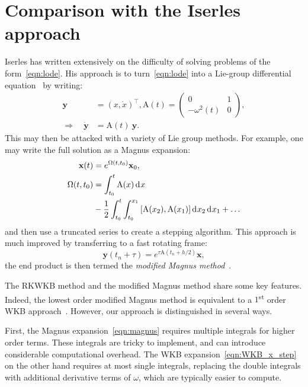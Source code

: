\section{Comparison with the Iserles approach}
\label{sec:iserles_comparison}
Iserles has written extensively on the difficulty of solving problems of the form~\eqref{eqn:lode}. His approach is to turn~\eqref{eqn:lode} into a Lie-group differential equation~\citep{Iserles00lie-groupmethods} by writing:
\begin{align}
  \mathbf{y} &= {(x,\dot{x})}^\top, 
  \mathrm{A}(t) = 
  \left(
  \begin{array}{cc}
    0 & 1 \\
    -\omega^2(t) & 0
  \end{array}
  \right),
  \nonumber\\
  \Rightarrow\quad 
  \dot{\mathbf{y}} &= \mathrm{A} (t) \: \mathbf{y}.\label{eqn:lie_eqn}
\end{align}
This may then be attacked with a variety of Lie group methods. For example, one may write the full solution as a Magnus expansion:
\begin{align}
  \mathbf{x}(t) &= e^{\Omega(t,t_0)} \mathbf{x}_0,
  \label{eqn:magnus}\\
  \Omega(t,t_0) &= \int_{t_0}^t \mathrm{A}(x) \operatorname{d}^{}\!{x} \nonumber \\
  &- \frac{1}{2}\int_{t_0}^t\int_{t_0}^{x_1} \left[\mathrm{A}(x_2),\mathrm{A}(x_1)\right] \operatorname{d}^{}\!{x_2} \operatorname{d}^{}\!{x_1} + \ldots
  \nonumber
\end{align}
and then use a truncated series to create a stepping algorithm.
This approach is much improved by transferring to a fast rotating frame:
\begin{equation}
  \mathbf{y}(t_n+\tau) = e^{\tau \mathrm{A}(t_n+h/2)} \mathbf{x},
  \label{eqn:rotating_frame}
\end{equation}
the end product is then termed the {\em modified Magnus method\/}~\citep{Iserles01thinkglobally}.

The RKWKB method and the modified Magnus method share some key features. Indeed, the lowest order modified Magnus method is equivalent to a $1$\textsuperscript{st} order WKB approach~\citep{Iserles02globalerror}. However, our approach is distinguished in several ways. 

First, the Magnus expansion~\eqref{eqn:magnus} requires multiple integrals for higher order terms. These integrals are tricky to implement, and can introduce considerable computational overhead. The WKB expansion~\eqref{eqn:WKB_x_step} on the other hand requires at most single integrals, replacing the double integrals with additional derivative terms of $\omega$, which are typically easier to compute.

